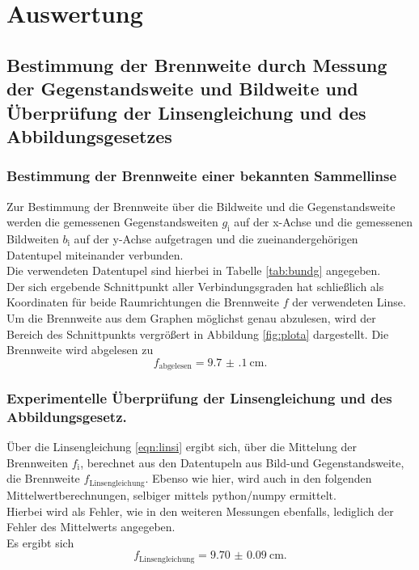 \section{Auswertung}
\label{sec:Auswertung}

\subsection{Bestimmung der Brennweite durch Messung der Gegenstandsweite und Bildweite und Überprüfung der Linsengleichung und des Abbildungsgesetzes}

\subsubsection{Bestimmung der Brennweite einer bekannten Sammellinse}
\label{sec:zuvor}
Zur Bestimmung der Brennweite über die Bildweite und die Gegenstandsweite werden die gemessenen Gegenstandsweiten $g_{\mathrm{i}}$ auf der x-Achse und die gemessenen Bildweiten $b_{\mathrm{i}}$ auf der y-Achse aufgetragen und die zueinandergehörigen Datentupel miteinander verbunden. \\
Die verwendeten Datentupel sind hierbei in Tabelle \ref{tab:bundg} angegeben.
\\Der sich ergebende Schnittpunkt aller Verbindungsgraden hat schließlich als Koordinaten für beide Raumrichtungen die Brennweite $f$ der verwendeten Linse. \\Um die Brennweite aus dem Graphen möglichst genau abzulesen, wird der Bereich des Schnittpunkts vergrößert in Abbildung \ref{fig:plota} dargestellt.
Die Brennweite wird abgelesen zu
\begin{equation*}
  f_{\mathrm{abgelesen}}=\SI{9.7(1)}{\centi\meter}\text{.}
\end{equation*}
\subsubsection{Experimentelle Überprüfung der Linsengleichung und des Abbildungsgesetz.}
Über die Linsengleichung \eqref{eqn:linsi} ergibt sich, über die Mittelung der Brennweiten $f_{\mathrm{i}}$, berechnet aus den Datentupeln aus Bild-und Gegenstandsweite, die Brennweite $f_{\mathrm{Linsengleichung}}$.
Ebenso wie hier, wird auch in den folgenden Mittelwertberechnungen, selbiger mittels python/numpy \cite{numpy} ermittelt.\\
Hierbei wird als Fehler, wie in den weiteren Messungen ebenfalls, lediglich der Fehler des Mittelwerts angegeben.\\
Es ergibt sich
\begin{equation*}
  f_{\mathrm{Linsengleichung}}=\SI{9.70(9)}{\centi\meter}\text{.}
\end{equation*}

